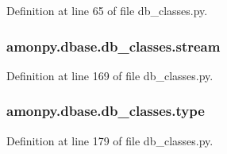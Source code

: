 Definition at line 65 of file db\-\_\-classes.\-py.

\hypertarget{namespaceamonpy_1_1dbase_1_1db__classes_a0e199a7f868e23d8c9fbc7b24bdb077b}{
\subsubsection[{stream}]{\setlength{\rightskip}{0pt plus 5cm}amonpy.\-dbase.\-db\-\_\-classes.\-stream}}\label{namespaceamonpy_1_1dbase_1_1db__classes_a0e199a7f868e23d8c9fbc7b24bdb077b}


Definition at line 169 of file db\-\_\-classes.\-py.

\hypertarget{namespaceamonpy_1_1dbase_1_1db__classes_a04cee57fa78ee7e1a979dc075aced634}{
\subsubsection[{type}]{\setlength{\rightskip}{0pt plus 5cm}amonpy.\-dbase.\-db\-\_\-classes.\-type}}\label{namespaceamonpy_1_1dbase_1_1db__classes_a04cee57fa78ee7e1a979dc075aced634}


Definition at line 179 of file db\-\_\-classes.\-py.

